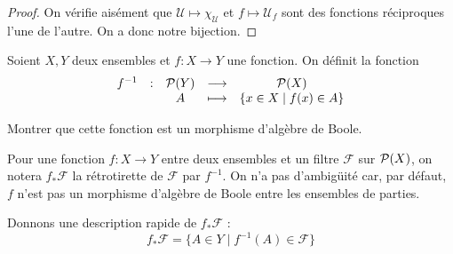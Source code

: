\begin{proof}
  On vérifie aisément que $\mathcal U \mapsto \chi_\mathcal U$ et
  $f\mapsto \mathcal U_f$ sont des fonctions réciproques l'une de l'autre.
  On a donc notre bijection.
\end{proof}

\begin{exercise}
  Soient $X,Y$ deux ensembles et $f : X \to Y$ une fonction. On définit la
  fonction
  \[\begin{array}{ccccc}
  f^{-1} & : & \mathcal{P}(Y) & \longrightarrow & \mathcal{P}(X)\\
  & & A & \longmapsto & \{x\in X \mid f(x) \in A\}
  \end{array}\]

  Montrer que cette fonction est un morphisme d'algèbre de Boole.
\end{exercise}

\begin{notation}
  Pour une fonction $f : X \to Y$ entre deux ensembles et un filtre $\mathcal F$
  sur $\mathcal{P}(X)$, on notera $f_*\mathcal F$ la rétrotirette de $\mathcal F$
  par $f^{-1}$. On n'a pas d'ambigüité car, par défaut, $f$ n'est pas un
  morphisme d'algèbre de Boole entre les ensembles de parties.

  Donnons une description rapide de $f_*\mathcal F$ :
  \[f_*\mathcal F = \{A \in Y \mid f^{-1}(A) \in \mathcal F\}\]
\end{notation}
